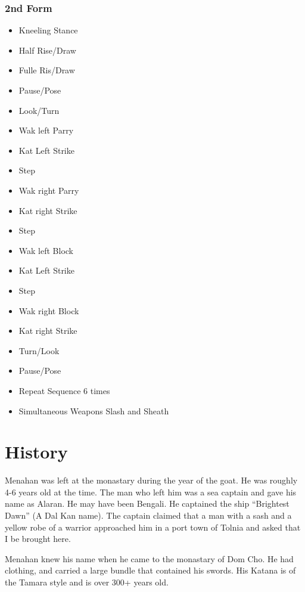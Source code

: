 \documentclass[10pt]{report}
\begin{document}
\subsection{2nd Form}
\begin{itemize}
         \item Kneeling Stance
         \item Half Rise/Draw
         \item Fulle Ris/Draw
         \item Pause/Pose
         \item Look/Turn
         \item Wak left Parry
         \item Kat Left Strike
         \item Step
         \item Wak right Parry
         \item Kat right Strike
         \item Step
         \item Wak left Block
         \item Kat Left Strike
         \item Step
         \item Wak right Block
         \item Kat right Strike
         \item Turn/Look
         \item Pause/Pose
         \item Repeat Sequence 6 times
         \item Simultaneous Weapons Slash and Sheath
\end{itemize}

\chapter{History}

Menahan was left at the monastary during the year of the goat. He was
roughly 4-6 years old at the time. The man who left him was a sea
captain and gave his name as Alaran.  He may have been Bengali. He
captained the ship ``Brightest Dawn'' (A Dal Kan name). The captain
claimed that a man with a sash and a yellow robe of a warrior approached
him in a port town of Tolnia and asked that I be brought here.

Menahan knew his name when he came to the monastary of Dom Cho. He had
clothing, and carried a large bundle that contained his swords. His
Katana is of the Tamara style and is over 300+ years old.
\end{document}
